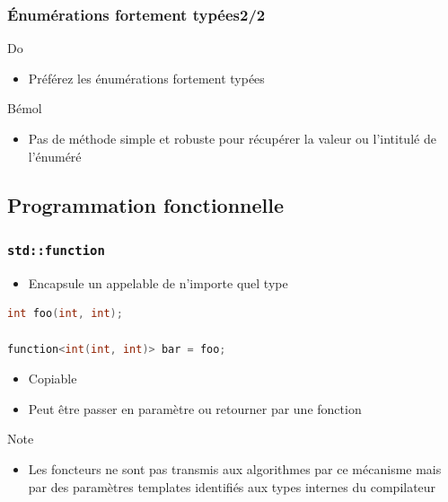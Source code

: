 \documentclass[C++.tex]{subfiles}
\begin{document}
\begin{frame}[fragile]
	\frametitle{Énumérations fortement typées\titlehfill{}2/2}
	\begin{exampleblock}{Do}
		\begin{itemize}
			\item Préférez les énumérations fortement typées
		\end{itemize}
	\end{exampleblock}

	\begin{block}{Bémol}
		\begin{itemize}
			\item Pas de méthode simple et robuste pour récupérer la valeur ou l'intitulé de l'énuméré
		\end{itemize}

	\end{block}
\end{frame}

\subsection*{Programmation fonctionnelle}
\begin{frame}[fragile]
	\frametitle{\lstinline|std::function|}

	\begin{itemize}
		\item Encapsule un appelable de n'importe quel type
	\end{itemize}

	\begin{lstlisting}[language=C++]
int foo(int, int);

function<int(int, int)> bar = foo;\end{lstlisting}

	\begin{itemize}
		\item Copiable
		\item Peut être passer en paramètre ou retourner par une fonction
	\end{itemize}

	\begin{block}{Note}
		\begin{itemize}
			\item Les foncteurs ne sont pas transmis aux algorithmes par ce mécanisme mais par des paramètres templates identifiés aux types internes du compilateur
		\end{itemize}
	
	\end{block}
\end{frame}
\end{document}
